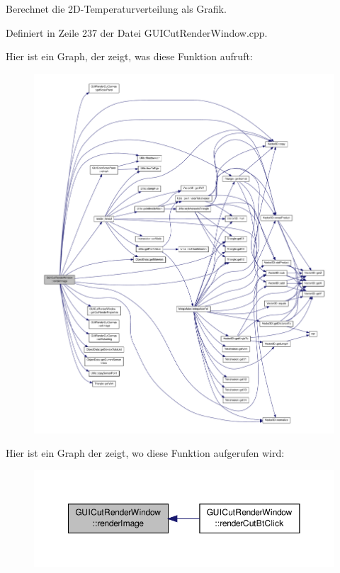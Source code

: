 Berechnet die 2\-D-\/\-Temperaturverteilung als Grafik. 



Definiert in Zeile 237 der Datei G\-U\-I\-Cut\-Render\-Window.\-cpp.



Hier ist ein Graph, der zeigt, was diese Funktion aufruft\-:
\nopagebreak
\begin{figure}[H]
\begin{center}
\leavevmode
\includegraphics[width=350pt]{classGUICutRenderWindow_a9eedb7088ad31f4680a77ed3a06fa60c_cgraph}
\end{center}
\end{figure}




Hier ist ein Graph der zeigt, wo diese Funktion aufgerufen wird\-:\nopagebreak
\begin{figure}[H]
\begin{center}
\leavevmode
\includegraphics[width=350pt]{classGUICutRenderWindow_a9eedb7088ad31f4680a77ed3a06fa60c_icgraph}
\end{center}
\end{figure}




